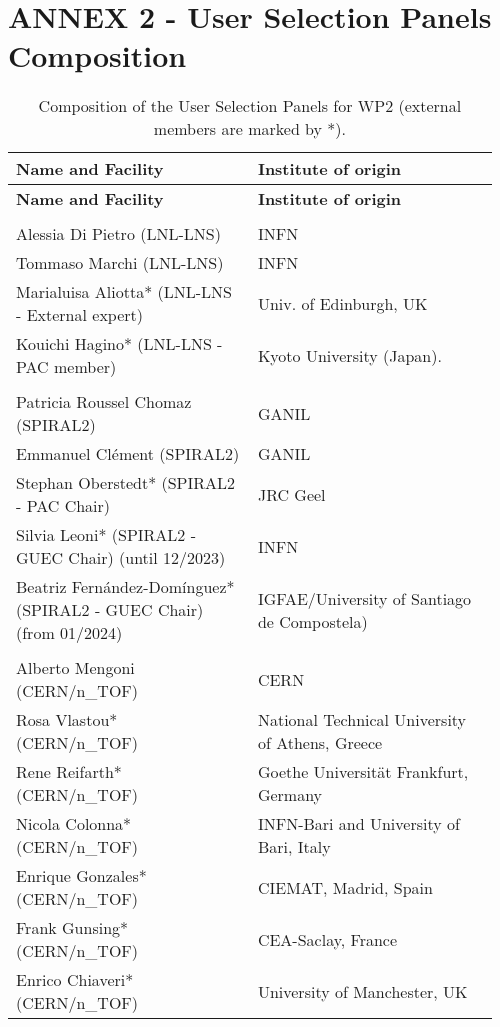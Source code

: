 %

\section{ANNEX 2 - User Selection Panels Composition} 
\label{sec:usp-composition}


\begin{longtable}{|L{0.48\linewidth}|C{0.48\linewidth}|}
\caption{Composition of the User Selection Panels for WP2 (external members are marked by *).}
\label{tab:usp-wp2}
    \\ \hline
    {\bf Name and Facility} & {\bf Institute of origin} \\ \hline
    \endfirsthead
    \hline
    {\bf Name and Facility} & {\bf Institute of origin} \\ \hline
    \endhead
    \hline
    \endfoot

      \\ \hline
    Alessia Di Pietro (LNL-LNS)	& INFN \\ \hline
    Tommaso Marchi (LNL-LNS)	 & INFN \\ \hline
    Marialuisa Aliotta* (LNL-LNS - External expert) &	Univ. of Edinburgh, UK \\ \hline
    Kouichi Hagino*  (LNL-LNS - PAC member)	& Kyoto University (Japan). \\ \hline
    
      \\ \hline
    Patricia Roussel Chomaz  (SPIRAL2)	& GANIL \\ \hline
    Emmanuel Clément (SPIRAL2)	& GANIL \\ \hline
    Stephan Oberstedt* (SPIRAL2 - PAC Chair) &	JRC Geel \\ \hline
    Silvia Leoni* (SPIRAL2 - GUEC Chair) (until 12/2023)	& INFN \\ \hline
   Beatriz Fernández-Domínguez* (SPIRAL2 - GUEC Chair) (from 01/2024)	& 
IGFAE/University of Santiago de Compostela)  \\ \hline
        
      \\ \hline
    Alberto Mengoni (CERN/n\_TOF)	& CERN \\ \hline
    Rosa Vlastou* (CERN/n\_TOF)	& National Technical University of Athens, Greece \\ \hline
    Rene Reifarth* (CERN/n\_TOF)	& Goethe Universität Frankfurt, Germany \\ \hline
    Nicola Colonna* (CERN/n\_TOF)	& INFN-Bari and University of Bari, Italy \\ \hline
    Enrique Gonzales* (CERN/n\_TOF)	& CIEMAT, Madrid, Spain \\ \hline
    Frank Gunsing* (CERN/n\_TOF)	& CEA-Saclay, France \\ \hline
    Enrico Chiaveri* (CERN/n\_TOF)	& University of Manchester, UK \\ \hline
    

\end{longtable}
